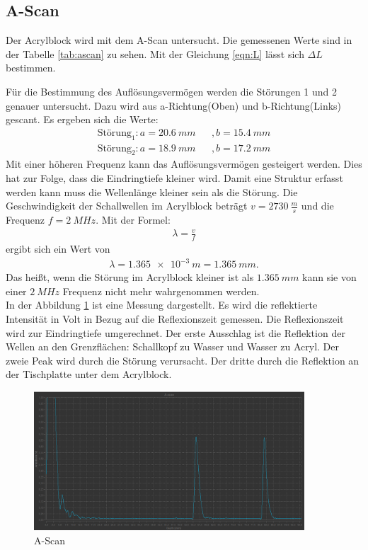 \subsection{A-Scan}
Der Acrylblock wird mit dem A-Scan untersucht. Die gemessenen Werte sind in der Tabelle \ref{tab:ascan} zu sehen.
Mit der Gleichung \ref{eqn:L} lässt sich $\Delta L$ bestimmen.

Für die Bestimmung des Auflösungsvermögen werden die Störungen 1 und 2 genauer untersucht.
Dazu wird aus a-Richtung(Oben) und b-Richtung(Links) gescant.
Es ergeben sich die Werte:
\begin{align*}
  \text{Störung}_1: a=\SI{20,6}{mm}  && ,  b=\SI{15,4}{mm}\\
  \text{Störung}_2: a=\SI{18,9}{mm}  && ,  b=\SI{17,2}{mm}
\end{align*}
Mit einer höheren Frequenz kann das Auflösungsvermögen gesteigert werden.
Dies hat zur Folge, dass die Eindringtiefe kleiner wird.
Damit eine Struktur erfasst werden kann muss die Wellenlänge kleiner sein als die Störung.
Die Geschwindigkeit der Schallwellen im Acrylblock beträgt $v=\SI{2730}{\frac{m}{s}}$ und die Frequenz $f=\SI{2}{MHz}$.
Mit der Formel:
\begin{align*}
  \lambda = \frac{v}{f}
\end{align*}
ergibt sich ein Wert von
\begin{align}
  \lambda=\SI{1,365e-3}{m}=\SI{1,365}{mm}.
  \label{eqn:a}
\end{align}
Das heißt, wenn die Störung im Acrylblock kleiner ist als $\SI{1,365}{mm}$ kann sie von einer $\SI{2}{MHz}$ Frequenz
nicht mehr wahrgenommen werden.\\
In der Abbildung \ref{fig:ascan} ist eine Messung dargestellt.
Es wird die reflektierte Intensität in Volt in Bezug auf die Reflexionszeit gemessen.
Die Reflexionszeit wird zur Eindringtiefe umgerechnet.
Der erste Ausschlag ist die Reflektion der Wellen an den Grenzflächen: Schallkopf zu Wasser und Wasser zu Acryl.
Der zweie Peak wird durch die Störung verursacht.
Der dritte durch die Reflektion an der Tischplatte unter dem Acrylblock.
\begin{figure}[h!]
  \centering
  \includegraphics[width=0.9\textwidth]{ascan.png}
  \caption{A-Scan \cite{1}}
  \label{fig:ascan}
\end{figure}
\FloatBarrier

